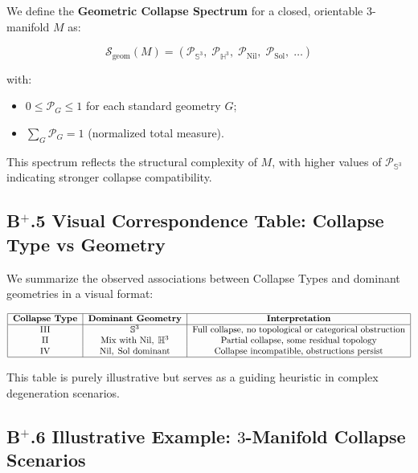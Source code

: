 \documentclass[11pt]{article}
\begin{document}
We define the \textbf{Geometric Collapse Spectrum} for a closed, orientable $3$-manifold $M$ as:

\[
\mathcal{S}_{\mathrm{geom}}(M) = \left( \mathcal{P}_{\mathbb{S}^3},\; \mathcal{P}_{\mathbb{H}^3},\; \mathcal{P}_{\mathrm{Nil}},\; \mathcal{P}_{\mathrm{Sol}},\; \ldots \right)
\]

with:

\begin{itemize}
    \item $0 \leq \mathcal{P}_G \leq 1$ for each standard geometry $G$;
    \item $\sum_G \mathcal{P}_G = 1$ (normalized total measure).
\end{itemize}

This spectrum reflects the structural complexity of $M$, with higher values of $\mathcal{P}_{\mathbb{S}^3}$ indicating stronger collapse compatibility.

\subsection*{B$^{+}$.5 Visual Correspondence Table: Collapse Type vs Geometry}

We summarize the observed associations between Collapse Types and dominant geometries in a visual format:

\[
\begin{tabular}{|c|c|c|}
\hline
\textbf{Collapse Type} & \textbf{Dominant Geometry} & \textbf{Interpretation} \\
\hline
III & $\mathbb{S}^3$ & Full collapse, no topological or categorical obstruction \\
II  & Mix with $\mathrm{Nil},\; \mathbb{H}^3$ & Partial collapse, some residual topology \\
IV  & $\mathrm{Nil},\; \mathrm{Sol}$ dominant & Collapse incompatible, obstructions persist \\
\hline
\end{tabular}
\]

This table is purely illustrative but serves as a guiding heuristic in complex degeneration scenarios.

\subsection*{B$^{+}$.6 Illustrative Example: $3$-Manifold Collapse Scenarios}
\end{document}
